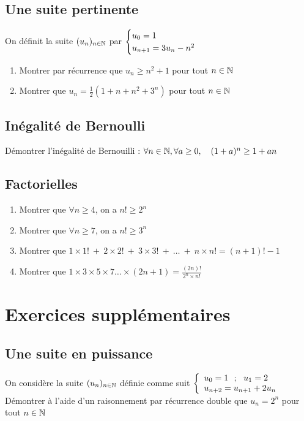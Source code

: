\documentclass[oneside,12pt]{book}          %
\begin{document}
\subsection{Une suite pertinente}
On définit la suite ${(u_{n})_{n\in\mathbb N}}$ par $\defsuite{u_0=1}{3u_n-n^2}$
\begin{enumerate}
	\item Montrer par récurrence que $u_n\geq n^2+1$ pour tout ${n\in\mathbb N}$
	\item Montrer que $u_n=\frac{1}{2}(1+n+n^2+3^n)$ pour tout ${n\in\mathbb N}$
\end{enumerate}
    


\subsection{Inégalité de Bernoulli}
Démontrer l'inégalité de Bernouilli : $\forall{n\in\mathbb N}, \forall a\geq0,\quad (1+a)^n\geq1+an$



\subsection{Factorielles}
\begin{enumerate}
    \item Montrer que $\forall n\geq4$, on a $n!\geq2^n$
    \item Montrer que $\forall n\geq7$, on a $n!\geq3^n$
    \item Montrer que $1\times1!~+~2\times2!~+~3\times3!~+~\ldots~+~n\times n!=(n+1)!-1$
    \item Montrer que $1\times3\times5\times7\ldots\times(2n+1)=\frac{(2n)!}{2^n\times n!}$
\end{enumerate}



\section{Exercices supplémentaires}

\subsection{Une suite en puissance}

On considère la suite ${(u_{n})_{n\in\mathbb N}}$ définie comme suit $\accolsized{u_0=1~~;~~u_1=2\\u_{n+2}=u_{n+1}+2u_n}{1}$\\[5pt]
Démontrer à l'aide d'un raisonnement par récurrence double que $u_n=2^n$ pour tout ${n\in\mathbb N}$
\end{document}
